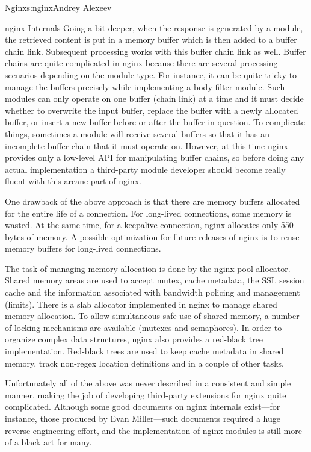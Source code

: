 \begin{aosachapter}{Nginx}{s:nginx}{Andrey Alexeev}
\begin{aosasect1}{nginx Internals}
Going a bit deeper, when the response is generated by a module, the
retrieved content is put in a memory buffer which is then added to a
buffer chain link. Subsequent processing works with this buffer chain
link as well. Buffer chains are quite complicated in nginx because
there are several processing scenarios depending on the module
type. For instance, it can be quite tricky to manage the buffers
precisely while implementing a body filter module. Such modules can
only operate on one buffer (chain link) at a time and it must decide
whether to overwrite the input buffer, replace the buffer with a newly
allocated buffer, or insert a new buffer before or after the buffer in
question. To complicate things, sometimes a module will receive
several buffers so that it has an incomplete buffer chain that it must
operate on. However, at this time nginx provides only a low-level API
for manipulating buffer chains, so before doing any actual
implementation a third-party module developer should become really
fluent with this arcane part of nginx.

One drawback of the above approach is that there are memory buffers
allocated for the entire life of a connection. For long-lived
connections, some memory is wasted. At the same time, for a keepalive
connection, nginx allocates only 550 bytes of memory. A possible
optimization for future releases of nginx is to reuse memory buffers
for long-lived connections.

The task of managing memory allocation is done by the nginx pool
allocator. Shared memory areas are used to accept mutex, cache
metadata, the SSL session cache and the information associated with
bandwidth policing and management (limits). There is a slab allocator
implemented in nginx to manage shared memory allocation. To allow
simultaneous safe use of shared memory, a number of locking mechanisms
are available (mutexes and semaphores). In order to organize complex
data structures, nginx also provides a red-black tree
implementation. Red-black trees are used to keep cache metadata in
shared memory, track non-regex location definitions and in a couple of
other tasks.

Unfortunately all of the above was never described in a consistent and
simple manner, making the job of developing third-party extensions for
nginx quite complicated. Although some good documents on nginx
internals exist---for instance, those produced by Evan Miller---such
documents required a huge reverse engineering effort, and the
implementation of nginx modules is still more of a black art for many.


\end{aosasect1}
\end{aosachapter}
